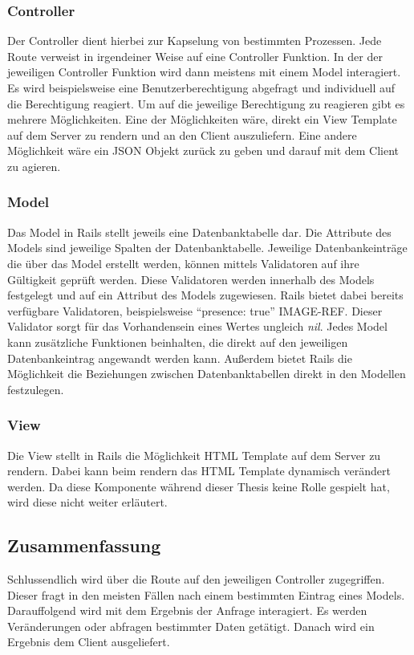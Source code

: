 \documentclass[paper=a4,fontsize=12pt,parskip=half]{scrartcl}
\newcommand{\hlnote}[2]{#1}
\newcommand{\hlnote}[2]{\todo{#2}\texthl{#1}}
\begin{document}
	\subsubsection{Controller}
	\label{sec: rails_controller}
	Der Controller dient hierbei zur Kapselung von bestimmten Prozessen. Jede Route verweist in irgendeiner Weise auf eine Controller Funktion. In der der jeweiligen Controller Funktion wird dann meistens mit einem Model interagiert. Es wird beispielsweise eine Benutzerberechtigung abgefragt und individuell auf die Berechtigung reagiert. Um auf die jeweilige Berechtigung zu reagieren gibt es mehrere Möglichkeiten. Eine der Möglichkeiten wäre, direkt ein View Template auf dem Server zu rendern und an den Client auszuliefern. Eine andere Möglichkeit wäre ein \gls{JSON} Objekt zurück zu geben und darauf mit dem Client zu agieren.
	
	\subsubsection{Model}
	\label{sec: rails_model}
	Das Model in Rails stellt jeweils eine Datenbanktabelle dar. Die Attribute des Models sind jeweilige Spalten der Datenbanktabelle. Jeweilige Datenbankeinträge die über das Model erstellt werden, können mittels Validatoren auf ihre Gültigkeit geprüft werden. Diese Validatoren werden innerhalb des Models festgelegt und auf ein Attribut des Models zugewiesen. Rails bietet dabei bereits verfügbare Validatoren, beispielsweise \enquote{presence: true} \hlnote{IMAGE-REF}{Bild Referenz}. Dieser Validator sorgt für das Vorhandensein eines Wertes ungleich \textit{nil}. Jedes Model kann zusätzliche Funktionen beinhalten, die direkt auf den jeweiligen Datenbankeintrag angewandt werden kann. Außerdem bietet Rails die Möglichkeit die Beziehungen zwischen Datenbanktabellen direkt in den Modellen festzulegen.
	
	\subsubsection{View}
	\label{sec: rails_view}
	Die View stellt in Rails die Möglichkeit \gls{HTML} Template auf dem Server zu rendern. Dabei kann beim rendern das \gls{HTML} Template dynamisch verändert werden. Da diese Komponente während dieser Thesis keine Rolle gespielt hat, wird diese nicht weiter erläutert.
	
	\subsection{Zusammenfassung}
	\label{sec: rails_resuemee}
	Schlussendlich wird über die Route auf den jeweiligen Controller zugegriffen. Dieser fragt in den meisten Fällen nach einem bestimmten Eintrag eines Models. Darauffolgend wird mit dem Ergebnis der Anfrage interagiert. Es werden Veränderungen oder abfragen bestimmter Daten getätigt. Danach wird ein Ergebnis dem Client ausgeliefert.
	
\end{document}
